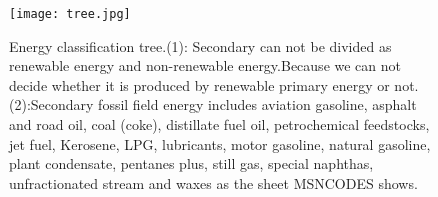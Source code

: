 \begin{figure}[htbp]
    \centering
    \texttt{[image: tree.jpg]}
    \caption{Energy classification tree.(1): Secondary can not be divided as renewable energy and non-renewable energy.Because we can not decide whether it is produced by renewable primary energy or not. (2):Secondary fossil field energy includes aviation gasoline, asphalt and road oil, coal (coke), distillate fuel oil, petrochemical feedstocks, jet fuel, Kerosene, LPG, lubricants, motor gasoline, natural gasoline, plant condensate, pentanes plus, still gas, special naphthas, unfractionated stream and waxes as the sheet MSNCODES shows. }
    \label{12345678}
\end{figure}
